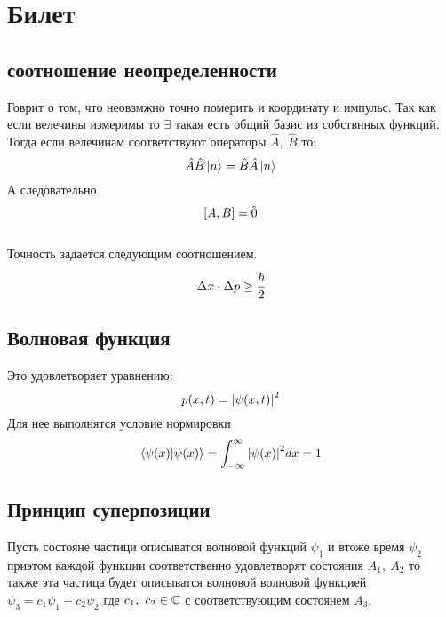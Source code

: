 \section{Билет}
\subsection{соотношение неопределенности}
Говрит о том, что неовзмжно точно померить и координату и импульс.
 Так как если велечины измеримы то $\exists$ такая есть общий базис 
 из собствнных функций. Тогда если велечинам соответствуют 
 операторы $\hat A,\ \hat B$ то:
$$ \hat A \hat B \ket{n} = \hat B \hat A  \ket{n}$$
А следовательно 
$$\left[ A, B \right] = \hat 0$$
\\
Точность задается следующим соотношением. 
$$\Delta x \cdot \Delta p \geq \cfrac{\hslash}{2}$$

\subsection{Волновая функция}
Это удовлетворяет уравнению:
$$
p (x, t) = \abs{\psi (x, t)}^2
$$
Для нее выполнятся условие нормировки 
$$\braket{\psi (x)}{\psi (x)} = \int_{-\infty}^{\infty}
 \abs{\psi (x)}^2 dx = 1$$


\subsection{Принцип суперпозиции}
Пусть состояне частици описыватся волновой функций $\psi_1$
 и втоже время $\psi_2$ приэтом каждой функции соответственно удовлетворят
 состояния $A_1, \ A_2$ то также эта частица будет описыватся волновой 
 волновой функцией $\psi_3 = c_1 \psi_1 + c_2 \psi_2$ где $c_1, \ c_2 \in 
 \mathbb{C}$ с соответствующим состоянем $A_3$.









